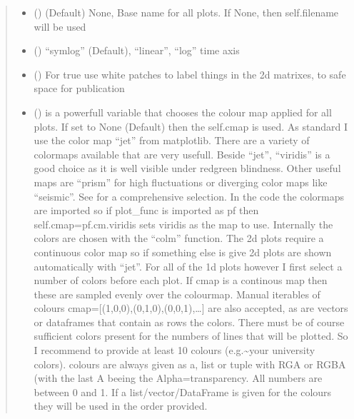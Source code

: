 \documentclass[letterpaper,10pt,english]{sphinxmanual}
\begin{document}
\begin{fulllineitems}
\begin{fulllineitems}
\begin{quote}
\begin{description}
\begin{itemize}
\item {} 
 (\sphinxstyleliteralemphasis{\sphinxupquote{, }}) \textendash{} (Default) None, Base name for all plots. If None, then self.filename will be used

\item {} 
 (\sphinxstyleliteralemphasis{\sphinxupquote{, }}) \textendash{} “symlog” (Default), “linear”, “log” time axis

\item {} 
 (\sphinxstyleliteralemphasis{\sphinxupquote{, }}) \textendash{} For true use white patches to label things in the 2d matrixes, to safe
space for publication

\item {} 
 (\sphinxstyleliteralemphasis{\sphinxupquote{, }}) \textendash{} is a powerfull variable that chooses the colour map applied for all plots. If set to
None (Default) then the self.cmap is used.
As standard I use the color map “jet” from matplotlib. There are a variety of colormaps
available that are very usefull. Beside “jet”, “viridis” is a good choice as it is well
visible under red\sphinxhyphen{}green blindness. Other useful maps are “prism” for high fluctuations
or diverging color maps like “seismic”.
See  for a comprehensive
selection. In the code the colormaps are imported so if plot\_func is imported as pf then
self.cmap=pf.cm.viridis sets viridis as the map to use. Internally the colors are chosen
with the “colm” function. The 2d plots require a continuous color map so if something
else is give 2d plots are shown automatically with “jet”. For all of the 1d plots however
I first select a number of colors before each plot. If cmap is a continous map then these
are sampled evenly over the colourmap. Manual iterables of colours
cmap={[}(1,0,0),(0,1,0),(0,0,1),…{]} are also accepted, as are vectors or dataframes that
contain as rows the colors. There must be of course sufficient colors present for
the numbers of lines that will be plotted. So I recommend to provide at least 10 colours
(e.g.\textasciitilde{}your university colors). colours are always given as a, list or tuple with RGA or RGBA
(with the last A beeing the Alpha=transparency. All numbers are between 0 and 1.
If a list/vector/DataFrame is given for the colours they will be used in the order provided.


\end{itemize}
\end{description}
\end{quote}
\end{fulllineitems}
\end{fulllineitems}
\end{document}
